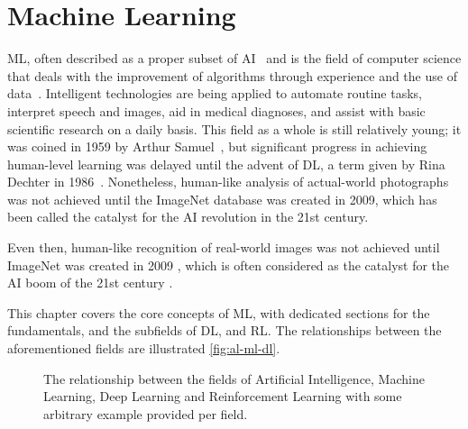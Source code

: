 \chapter{Machine Learning\label{chap:machine_learning}}
\Gls{ML}, often described as a proper subset of \gls{AI}~\cite{Goodfellow-et-al-2016} and is the field of computer science that deals with the improvement of algorithms through experience and the use of data~\cite{Mitchell97}. Intelligent technologies are being applied to automate routine tasks, interpret speech and images, aid in medical diagnoses, and assist with basic scientific research on a daily basis. This field as a whole is still relatively young; it was coined in 1959 by Arthur Samuel~\cite{5392560}, but significant progress in achieving human-level learning was delayed until the advent of \gls{DL}, a term given by Rina Dechter in 1986~\cite{Rina1986}. Nonetheless, human-like analysis of actual-world photographs was not achieved until the ImageNet database was created in 2009, which has been called the catalyst for the \gls{AI} revolution in the 21st century.




Even then, human-like recognition of real-world images was not achieved until ImageNet was created in 2009 \cite{5206848}, which is often considered as the catalyst for the AI boom of the 21st century \cite{hardy_2016}.


This chapter covers the core concepts of \gls{ML}, with dedicated sections for
the fundamentals, and the subfields of \gls{DL}, and \gls{RL}. The relationships
between the aforementioned fields are illustrated \autoref{fig:al-ml-dl}.

\begin{figure}[htp!]
    \centering
    
    \captionsetup{format=hang} %
    \caption{
        The relationship between the fields of Artificial Intelligence,
        Machine Learning, Deep Learning and Reinforcement Learning with some
        arbitrary example provided per field.
    }
    \label{fig:al-ml-dl}
\end{figure}

